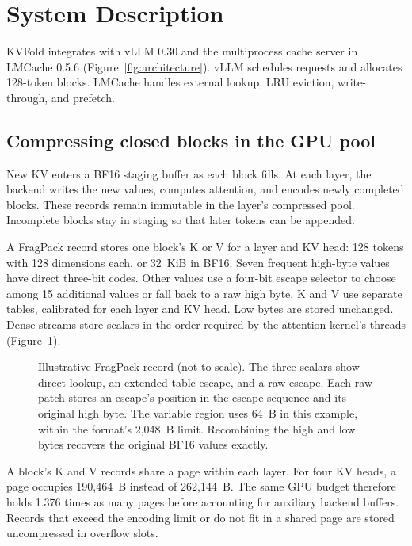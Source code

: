 \documentclass[conference]{IEEEtran}
\begin{document}
\section{System Description}
\label{sec:design}
KVFold integrates with vLLM 0.30 and the multiprocess cache server in
LMCache 0.5.6 (Figure~\ref{fig:architecture}). vLLM schedules requests and
allocates 128-token blocks. LMCache handles external lookup, LRU eviction,
write-through, and prefetch.

\subsection{Compressing closed blocks in the GPU pool}
New KV enters a BF16 staging buffer as each block fills. At each
layer, the backend writes the new values, computes attention, and encodes
newly completed blocks. These records remain immutable in the
layer's compressed pool. Incomplete blocks stay in staging so that later
tokens can be appended.

A FragPack record stores one block's K or V for a layer and KV head:
128 tokens with 128 dimensions each, or 32~KiB in BF16. Seven frequent
high-byte values have direct three-bit codes. Other values use a four-bit
escape selector to choose among 15 additional values or fall back to a raw
high byte. K and V use separate tables, calibrated for each layer and KV
head. Low bytes are stored unchanged. Dense streams store scalars in the
order required by the attention kernel's threads
(Figure~\ref{fig:record}).

\begin{figure}[t]
\centering

\caption{Illustrative FragPack record (not to scale). The three scalars
show direct lookup, an extended-table
escape, and a raw escape. Each raw patch stores an escape's position in
the escape sequence and its original high byte. The variable region uses
64~B in this example, within the format's 2,048~B limit. Recombining the
high and low bytes recovers the original BF16 values exactly.}
\label{fig:record}
\end{figure}

A block's K and V records share a page within each layer. For four KV heads,
a page occupies 190,464~B instead of 262,144~B. The same GPU budget therefore
holds 1.376 times as many pages before accounting for auxiliary backend
buffers. Records that exceed the encoding limit or do not fit in a shared
page are stored uncompressed in overflow slots.
\end{document}
